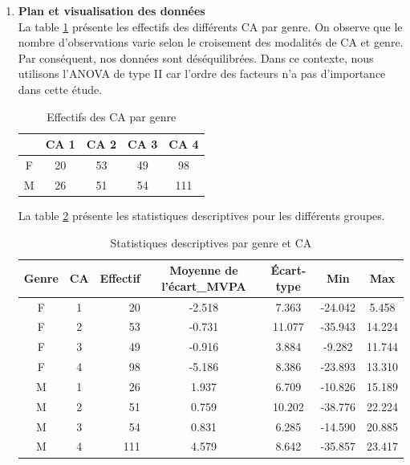 \documentclass[12pt,a4paper]{article}
\begin{document}
\begin{enumerate}[label=\textbf{\alph*})]
	\item \textbf{Plan et visualisation des données}\\
	
	La table \ref{tab:ca_gender} présente les effectifs des différents CA par genre. On observe que le nombre d’observations varie selon le croisement des modalités de CA et genre. Par conséquent, nos données sont déséquilibrées. Dans ce contexte, nous utilisons l'ANOVA de type II car l'ordre des facteurs n'a pas d'importance dans cette étude.\\
	
	\begin{table}[H]
		\centering
		\caption{Effectifs des CA par genre}
		\begin{tabular}{ccccc}
			\toprule
			& CA 1 & CA 2 & CA 3 & CA 4 \\ 
			\midrule
			F & 20 & 53 & 49 & 98 \\ 
			M & 26 & 51 & 54 & 111 \\ 
			\bottomrule
		\end{tabular}
		\label{tab:ca_gender}
	\end{table}
	
	La table \ref{tab:desc_stats_CA} présente les statistiques descriptives pour les différents groupes.\\
	
	\begin{table}[H]
		\centering
		\caption{Statistiques descriptives par genre et CA}
		\begin{tabular}{ccrcccc}
			\toprule
			\textbf{Genre} & \textbf{CA} & \textbf{Effectif} & \textbf{Moyenne de l'écart\_MVPA} & \textbf{Écart-type} & \textbf{Min} & \textbf{Max} \\
			\midrule
			F & 1 & 20 & -2.518 & 7.363 & -24.042 & 5.458 \\
			F & 2 & 53 & -0.731 & 11.077 & -35.943 & 14.224 \\
			F & 3 & 49 & -0.916 & 3.884 & -9.282 & 11.744 \\
			F & 4 & 98 & -5.186 & 8.386 & -23.893 & 13.310 \\
			M & 1 & 26 & 1.937 & 6.709 & -10.826 & 15.189 \\
			M & 2 & 51 & 0.759 & 10.202 & -38.776 & 22.224 \\
			M & 3 & 54 & 0.831 & 6.285 & -14.590 & 20.885 \\
			M & 4 & 111 & 4.579 & 8.642 & -35.857 & 23.417 \\
			\bottomrule
		\end{tabular}
		\label{tab:desc_stats_CA}
	\end{table}
	

\end{enumerate}
\end{document}
